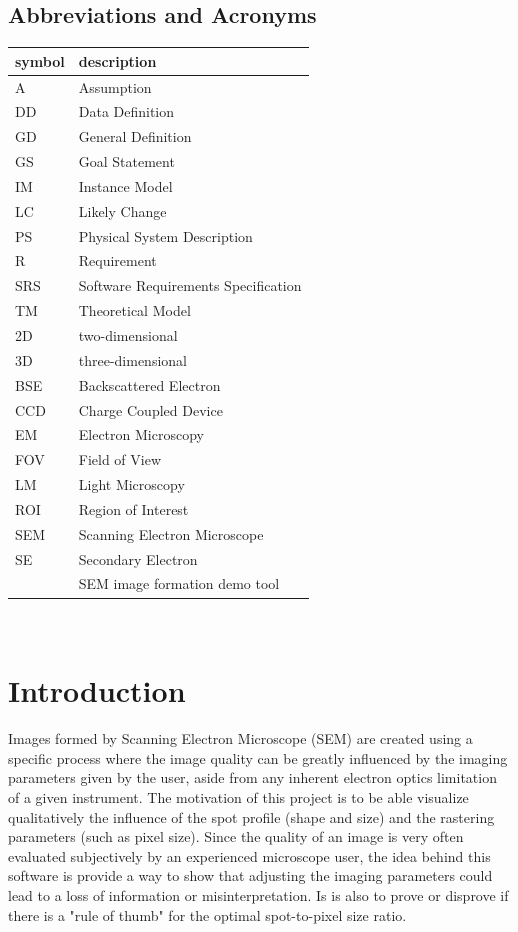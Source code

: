 \documentclass[12pt]{article}
\begin{document}
\subsection{Abbreviations and Acronyms}

\renewcommand{\arraystretch}{1.2}
\begin{tabular}{l l} 
  \toprule		
  \textbf{symbol} & \textbf{description}\\
  \midrule 
  A & Assumption\\
  DD & Data Definition\\
  GD & General Definition\\
  GS & Goal Statement\\
  IM & Instance Model\\
  LC & Likely Change\\
  PS & Physical System Description\\
  R & Requirement\\
  SRS & Software Requirements Specification\\
  TM & Theoretical Model\\
  2D & two-dimensional\\
  3D & three-dimensional\\
  BSE & Backscattered Electron\\
  CCD & Charge Coupled Device\\
  EM & Electron Microscopy\\
  FOV & Field of View\\
  LM & Light Microscopy\\
  ROI & Region of Interest\\
  SEM & Scanning Electron Microscope\\
  SE & Secondary Electron\\
  \progname{} & SEM image formation demo tool\\
  \bottomrule
\end{tabular}\\


\section{Introduction}

Images formed by Scanning Electron Microscope (SEM) are created using a 
specific process where the image quality can be greatly influenced by the 
imaging parameters given by the user, aside from any inherent electron 
optics limitation of a given instrument. The motivation of this project is 
to be able visualize qualitatively the influence of the spot profile 
(shape and size) and the rastering parameters (such as pixel size). Since the 
quality of an image is very often evaluated subjectively by an experienced 
microscope user, the idea behind this software is provide a way to show 
that adjusting the imaging parameters could lead to a loss of information 
or misinterpretation. Is is also to prove or disprove if there is a "rule 
of thumb" for the optimal spot-to-pixel size ratio.
\end{document}
